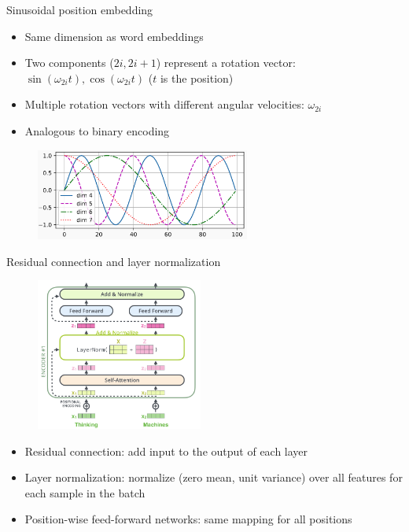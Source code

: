 \documentclass[usenames,dvipsnames,notes]{beamer}
\begin{document}
\begin{frame}
    {Sinusoidal position embedding}
    \begin{itemize}
        \item Same dimension as word embeddings
        \item Two components ($2i, 2i+1$) represent a rotation vector: $\sin(\omega_{2i}t), \cos(\omega_{2i}t)$ ($t$ is the position)
        \item Multiple rotation vectors with different angular velocities: $\omega_{2i}$
        \item Analogous to binary encoding
    \end{itemize}
    \begin{figure}
        \includegraphics[height=3cm]{figures/sinusoidal}
    \end{figure}
\end{frame}

\begin{frame}
    {Residual connection and layer normalization}
    \begin{figure}
        \includegraphics[height=5cm]{figures/add-norm}
    \end{figure}
    \vspace{-2em}
    \begin{itemize}
        \item Residual connection: add input to the output of each layer 
        \item Layer normalization: normalize (zero mean, unit variance) over all features for each sample in the batch
        \item Position-wise feed-forward networks: same mapping for all positions
    \end{itemize}
\end{frame}
\end{document}
